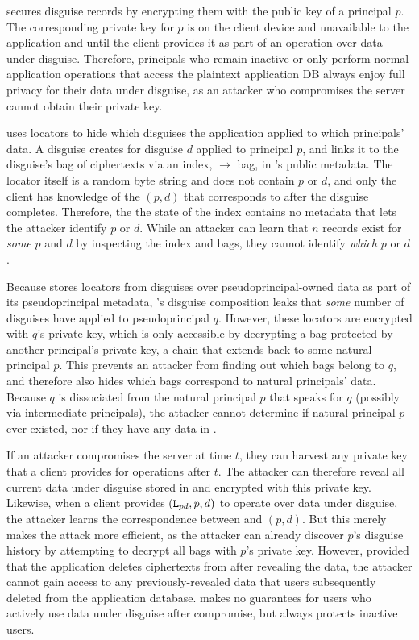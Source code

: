 %
\sys secures disguise records by encrypting them with the public key of a principal $p$.
%
The corresponding private key for $p$ is on the client device and unavailable to the
application and \sys until the client provides it as part of an operation over data
under disguise.
%
Therefore, principals who remain inactive or only perform normal application operations
that access the plaintext application DB always enjoy full privacy for their data under
disguise, as an attacker who compromises the server cannot obtain their private key.
%

%
\sys uses locators to hide which disguises the application applied to which
principals' data.
%
A disguise creates  for disguise $d$ applied to principal $p$, and links it
to the disguise's bag of ciphertexts via an index, $\to$ bag, in \sys's
public metadata.
%
The locator itself is a random byte string and does not contain $p$ or $d$, and
only the client has knowledge of the $(p, d)$ that  corresponds to after
the disguise completes.
%
Therefore, the the state of the index contains no metadata that lets the attacker
identify $p$ or $d$.
%
While an attacker can learn that $n$ records exist for \emph{some} $p$ and $d$ by
inspecting the index and bags, they cannot identify \emph{which} $p$ or $d$.
%

%
Because \sys stores locators from disguises over pseudoprincipal-owned data as part
of its pseudoprincipal metadata, \sys's disguise composition leaks that \emph{some}
number of disguises have applied to pseudoprincipal $q$.
%
However, these locators are encrypted with $q$'s private key, which is only accessible
by decrypting a bag protected by another principal's private key, a chain that extends
back to some natural principal $p$.
%
This prevents an attacker from finding out which bags belong to $q$, and therefore
also hides which bags correspond to natural principals' data.
%
Because $q$ is dissociated from the natural principal $p$ that speaks for $q$
(possibly via intermediate principals), the attacker cannot determine if natural
principal $p$ ever existed, nor if they have any data in \sys.
%

%
If an attacker compromises the server at time $t$, they can harvest any private key
that a client provides for operations after $t$.
%
The attacker can therefore reveal all current data under disguise stored in \sys and
encrypted with this private key.
%
Likewise, when a client provides $(\texttt{L}_{pd}, p, d)$ to operate over data under disguise,
the attacker learns the correspondence between  and $(p, d)$.
%
But this merely makes the attack more efficient, as the attacker can already discover
$p$'s disguise history by attempting to decrypt all bags with $p$'s private key.
%
However, provided that the application deletes ciphertexts from \sys after revealing
the data, the attacker cannot gain access to any previously-revealed data that users
subsequently deleted from the application database.
%
\sys makes no guarantees for users who actively use data under disguise after
compromise, but always protects inactive users.
%

